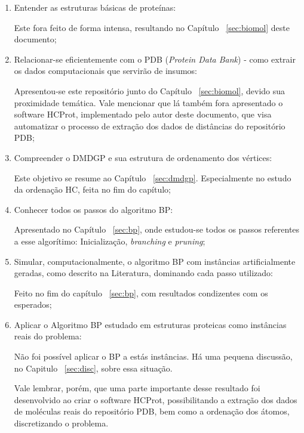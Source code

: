 \documentclass[a4paper,12pt]{article}
\begin{document}
	\begin{enumerate}
		\item Entender as estruturas básicas de proteínas:
		
		Este fora feito de forma intensa, resultando no Capítulo ~\ref{sec:biomol} deste documento;
		
		\item Relacionar-se eficientemente com o PDB (\emph{Protein Data Bank}) - como extrair os dados computacionais que servirão de insumos:
		
		Apresentou-se este repositório junto do Capítulo ~\ref{sec:biomol}, devido sua proximidade temática. Vale mencionar que lá também fora apresentado o software HCProt, implementado pelo autor deste documento, que visa automatizar o processo de extração dos dados de distâncias do repositório PDB;
		
		\item Compreender o DMDGP e sua estrutura de ordenamento dos vértices:
		
		Este objetivo se resume ao Capítulo ~\ref{sec:dmdgp}. Especialmente no estudo da ordenação HC, feita no fim do capítulo;
		
		\item Conhecer todos os passos do algoritmo BP:
		
		Apresentado no Capítulo ~\ref{sec:bp}, onde estudou-se todos os passos referentes a esse algorítimo: Inicialização, \textit{branching} e \textit{pruning};
		
		\item Simular, computacionalmente, o algoritmo BP com instâncias artificialmente geradas, como descrito na Literatura, dominando cada passo utilizado:
		
		Feito no fim do capítulo ~\ref{sec:bp}, com resultados condizentes com os esperados;
		
		\item Aplicar o Algoritmo BP estudado em estruturas proteicas como instâncias reais do problema:
		
		Não foi possível aplicar o BP a estás instâncias. Há uma pequena discussão, no Capitulo ~\ref{sec:disc}, sobre essa situação.
		
		Vale lembrar, porém, que uma parte importante desse resultado foi desenvolvido ao criar o software HCProt, possibilitando a extração dos dados de moléculas reais do repositório PDB, bem como a ordenação dos átomos, discretizando o problema.
	\end{enumerate}
	
\end{document}
